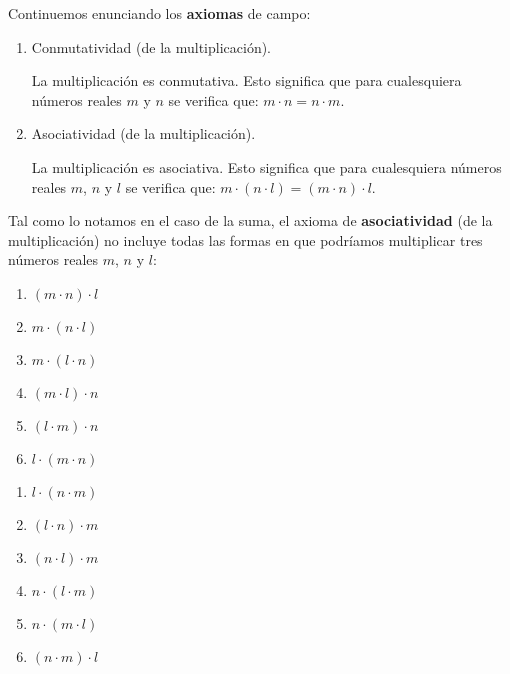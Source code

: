 \documentclass[11pt]{article}
\begin{document}
Continuemos enunciando los \textbf{axiomas} de campo:

\begin{enumerate}[label=M\arabic*.]
    \item Conmutatividad (de la multiplicación).
    
    La multiplicación es conmutativa. Esto significa que para cualesquiera números reales $m$ y $n$ se verifica que: $ m \cdot n = n \cdot m $.

    \item Asociatividad (de la multiplicación).
    
    La multiplicación es asociativa. Esto significa que para cualesquiera números reales $m$, $n$ y $l$ se verifica que: $ m \cdot (n \cdot l) = (m \cdot n) \cdot l $.
\end{enumerate}

Tal como lo notamos en el caso de la suma, el axioma de \textbf{asociatividad} (de la multiplicación) no incluye todas las formas en que podríamos multiplicar tres números reales $m$, $n$ y $l$:

\begin{adjustbox}{minipage=0.5\linewidth,margin=0pt \smallskipamount,center}
    \noindent\begin{minipage}[c]{.5\linewidth}
    \begin{enumerate}[label=\roman*.]
        \item $(m\cdot n)\cdot l$
        \item $m\cdot (n\cdot l)$
        \item $m\cdot (l\cdot n)$
        \item $(m\cdot l)\cdot n$
        \item $(l\cdot m)\cdot n$
        \item $l\cdot (m\cdot n)$
    \end{enumerate}
    \end{minipage}%
\begin{minipage}[c]{.5\linewidth}
    \begin{enumerate}[start=7,label=\roman*.]
        \item $l\cdot (n\cdot m)$
        \item $(l\cdot n)\cdot m$
        \item $(n\cdot l)\cdot m$
        \item $n\cdot (l\cdot m)$
        \item $n\cdot (m\cdot l)$
        \item $(n\cdot m)\cdot l$
    \end{enumerate}
\end{minipage}
\end{adjustbox}
\end{document}
